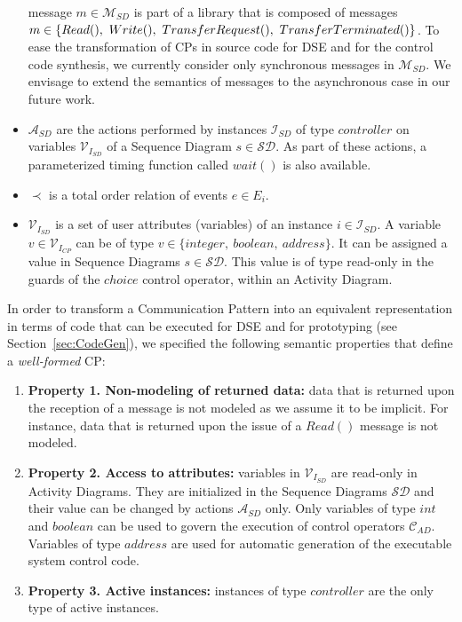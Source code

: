 \documentclass{llncs}
\begin{document}
\begin{subappendices}
\begin{itemize}
	message $m \in \mathcal{M}_{SD}$ is part of a library that is composed of messages $m \in \{Read(),\ Write(),\
	Transfer\-Request(),\ Transfer\-Terminated()\}$. To ease the transformation of CPs in source code for DSE and
	for the control code synthesis, we currently consider only synchronous messages in $\mathcal{M}_{SD}$. We
	envisage to extend the semantics of messages to the asynchronous case in our future work.
	\item $\mathcal{A}_{SD}$ are the actions performed by instances $\mathcal{I}_{SD}$ of type $controller$ on variables
	$\mathcal{V}_{{I}_{SD}}$ of a Sequence Diagram $s \in \mathcal{SD}$. As part of these actions, a parameterized timing function
	called $wait()$ is also available.
	\item $\prec$ is a total order relation of events $e \in E_i$.
	\item $\mathcal{V}_{{I}_{SD}}$ is a set of user attributes (variables) of an instance $i \in \mathcal{I}_{SD}$. A variable $v
	\in \mathcal{V}_{{I}_{CP}}$ can be of type $v \in \{integer,\ boolean,\ address\}$. It can be assigned a value in Sequence
	Diagrams $s \in \mathcal{SD}$. This value is of type read-only in the guards of the $choice$ control operator, within an Activity
	Diagram.
\end{itemize}
%
In order to transform a Communication Pattern into an equivalent representation in terms of code that can be executed
for DSE and for prototyping (see Section~\ref{sec:CodeGen}), we specified the following semantic properties that define
a \textit{well-formed} CP:
%
\begin{enumerate}
	\item \textbf{Property 1. Non-modeling of returned data:} data that is returned upon the reception of a message is
	not modeled as we assume it to be implicit. For instance, data that is returned upon the issue of a $Read()$ message
	is not modeled.
	\item \textbf{Property 2. Access to attributes:} variables in $\mathcal{V}_{{I}_{SD}}$ are read-only in Activity
	Diagrams. They are initialized in the Sequence Diagrams $\mathcal{SD}$ and their value can be changed by actions
	$\mathcal{A}_{SD}$ only. Only variables of type $int$ and $boolean$ can be used to govern the execution of control
	operators $\mathcal{C}_{AD}$. Variables of type $address$ are used for automatic generation of the executable system
	control code.
	\item \textbf{Property 3. Active instances:} instances of type $controller$ are the only type of active instances.

\end{enumerate}
\end{subappendices}
\end{document}
